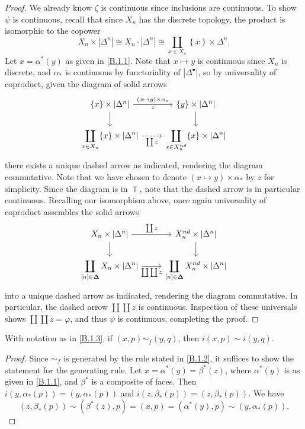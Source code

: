 \begin{proof}
	We already know $\zeta$ is continuous since inclusions are continuous. To show $\psi$ is continuous, recall that since $X_n$ has the discrete topology, the product is isomorphic to the copower
	\[
		X_n\times \left| \Delta^n \right| \cong X_n\cdot \left| \Delta^n\right| \cong \coprod_{x\in X_n} \left\{ x \right\} \times \Delta^n
	.\]
	Let $x=\alpha^*(y)$ as given in \cref{B.1.1}. Note that $x\mapsto y$ is continuous since $X_n$ is discrete, and $\alpha_*$ is continuous by functoriality of $\left| \Delta^{\bullet}  \right| $, so by universality of coproduct, given the diagram of solid arrows
	\[\begin{tikzcd}
	{\{x\}\times\left|\Delta^n\right|} & {\{y\}\times\left|\Delta^n\right|} \\
	{\displaystyle{\coprod_{x\in X_n}\{x\}\times\left|\Delta^n\right|}} & {\displaystyle{\coprod_{x\in X_n^{nd}}\{x\}\times\left|\Delta^n\right|}}
	\arrow["{(x\mapsto y)\times\alpha_*}", " z "', from=1-1, to=1-2]
	\arrow[from=1-1, to=2-1]
	\arrow[from=1-2, to=2-2]
	\arrow["{\coprod z}"', dashed, from=2-1, to=2-2]
	\end{tikzcd}\]
	there exists a unique dashed arrow as indicated, rendering the diagram commutative. Note that we have chosen to denote $(x\mapsto y)\times \alpha_*$ by $z$ for simplicity. Since the diagram is in $\Top $, note that the dashed arrow is in particular continuous. Recalling our isomorphism above, once again universality of coproduct assembles the solid arrows
	\[\begin{tikzcd}
	{X_n\times\left|\Delta^n\right|} & {X_n^{nd}\times\left|\Delta^n\right|} \\
	{\displaystyle{\coprod_{[n]\in\boldsymbol{\Delta}}X_n\times\left|\Delta^n\right|}} & {\displaystyle{\coprod_{[n]\in\boldsymbol{\Delta}}X_n^{nd}\times\left|\Delta^n\right|}}
	\arrow["{\coprod z}", from=1-1, to=1-2]
	\arrow[from=1-1, to=2-1]
	\arrow[from=1-2, to=2-2]
	\arrow["{\coprod\coprod z}"', from=2-1, to=2-2]
	\end{tikzcd}\]
	into a unique dashed arrow as indicated, rendering the diagram commutative. In particular, the dashed arrow $\coprod \coprod z$ is continuous. Inspection of these universals shows $\coprod\coprod z=\varphi$, and thus $\psi$ is continuous, completing the proof.
\end{proof}

\begin{lemma}\label{B.1.4}
	With notation as in \cref{B.1.3}, if $(x,p)\sim_f (y,q)$, then $i(x,p)\sim i(y,q)$.
\end{lemma}
\begin{proof}
	Since $\sim _f$ is generated by the rule stated in \cref{B.1.2}, it suffices to show the statement for the generating rule. Let $x=\alpha^*(y)=\beta^*(z)$, where $\alpha^*(y)$ is as given in \cref{B.1.1}, and $\beta^*$ is a composite of faces. Then $i(y,\alpha_*(p))=(y,\alpha_*(p))$ and $i(z,\beta_*(p))=(z,\beta_*(p))$. We have
	\[
		(z,\beta_*(p))\sim (\beta^*(z),p)=(x,p)=(\alpha^*(y),p)\sim (y,\alpha_*(p))
	.\]
\end{proof}

